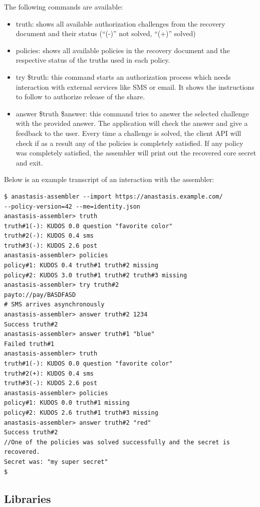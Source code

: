The following commands are available:
\begin{itemize}
\item truth: shows all available authorization challenges
  from the recovery document and their status (``(-)'' not solved, ``(+)'' solved)
\item policies: shows all available policies in the recovery document and
  the respective status of the truths used in each policy.
\item try \$truth: this command starts an authorization process which
  needs interaction with external services like SMS or email. It shows
  the instructions to follow to authorize release of the share.
\item answer \$truth \$answer: this command tries to answer the
  selected challenge with the provided answer. The application will
  check the answer and give a feedback to the user. Every time a
  challenge is solved, the client API will check if as a result any of
  the policies is completely satisfied.  If any policy was completely
  satisfied, the assembler will print out the recovered core secret
  and exit.
\end{itemize}

Below is an example transcript of an interaction with the assembler:

\begin{lstlisting}
$ anastasis-assembler --import https://anastasis.example.com/
--policy-version=42 --me=identity.json
anastasis-assembler> truth
truth#1(-): KUDOS 0.0 question "favorite color"
truth#2(-): KUDOS 0.4 sms
truth#3(-): KUDOS 2.6 post
anastasis-assembler> policies
policy#1: KUDOS 0.4 truth#1 truth#2 missing
policy#2: KUDOS 3.0 truth#1 truth#2 truth#3 missing
anastasis-assembler> try truth#2
payto://pay/BASDFASD
# SMS arrives asynchronously
anastasis-assembler> answer truth#2 1234
Success truth#2
anastasis-assembler> answer truth#1 "blue"
Failed truth#1
anastasis-assembler> truth
truth#1(-): KUDOS 0.0 question "favorite color"
truth#2(+): KUDOS 0.4 sms
truth#3(-): KUDOS 2.6 post
anastasis-assembler> policies
policy#1: KUDOS 0.0 truth#1 missing
policy#2: KUDOS 2.6 truth#1 truth#3 missing
anastasis-assembler> answer truth#2 "red"
Success truth#2
//One of the policies was solved successfully and the secret is recovered.
Secret was: "my super secret"
$
\end{lstlisting}



\subsection{Libraries} \label{sec:libraries}

